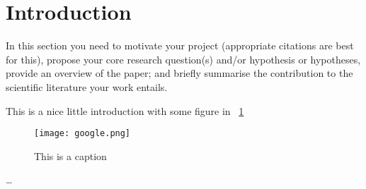 
\section{Introduction}
\label{sec:Introduction}

In this section you need to motivate your project (appropriate citations are best for this), propose your core research question(s) and/or hypothesis or hypotheses, provide an overview of the paper; and briefly summarise the contribution to the scientific literature your work entails. 

This is a nice little introduction with some figure in \figurename~\ref{fig:figureExample}

\begin{figure}[htp]
\begin{center}
  \texttt{[image: google.png]}
\caption{This is a caption}
\label{fig:figureExample}
\end{center}
\end{figure} 


\dots